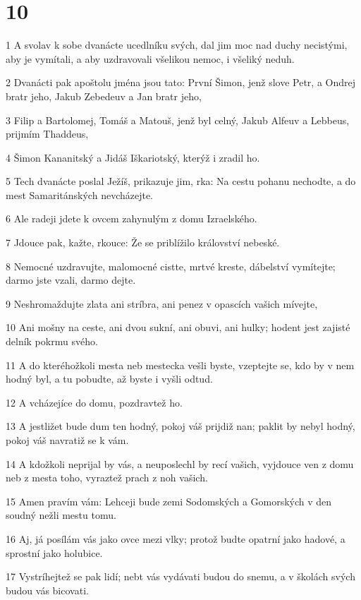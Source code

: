 \chapter{10}

\par 1 A svolav k sobe dvanácte ucedlníku svých, dal jim moc nad duchy necistými, aby je vymítali, a aby uzdravovali všelikou nemoc, i všeliký neduh.
\par 2 Dvanácti pak apoštolu jména jsou tato: První Šimon, jenž slove Petr, a Ondrej bratr jeho, Jakub Zebedeuv a Jan bratr jeho,
\par 3 Filip a Bartolomej, Tomáš a Matouš, jenž byl celný, Jakub Alfeuv a Lebbeus, prijmím Thaddeus,
\par 4 Šimon Kananitský a Jidáš Iškariotský, kterýž i zradil ho.
\par 5 Tech dvanácte poslal Ježíš, prikazuje jim, rka: Na cestu pohanu nechodte, a do mest Samaritánských nevcházejte.
\par 6 Ale radeji jdete k ovcem zahynulým z domu Izraelského.
\par 7 Jdouce pak, kažte, rkouce: Že se priblížilo království nebeské.
\par 8 Nemocné uzdravujte, malomocné cistte, mrtvé kreste, dábelství vymítejte; darmo jste vzali, darmo dejte.
\par 9 Neshromaždujte zlata ani stríbra, ani penez v opascích vašich mívejte,
\par 10 Ani mošny na ceste, ani dvou sukní, ani obuvi, ani hulky; hodent jest zajisté delník pokrmu svého.
\par 11 A do kteréhožkoli mesta neb mestecka vešli byste, vzeptejte se, kdo by v nem hodný byl, a tu pobudte, až byste i vyšli odtud.
\par 12 A vcházejíce do domu, pozdravtež ho.
\par 13 A jestližet bude dum ten hodný, pokoj váš prijdiž nan; paklit by nebyl hodný, pokoj váš navratiž se k vám.
\par 14 A kdožkoli neprijal by vás, a neuposlechl by recí vašich, vyjdouce ven z domu neb z mesta toho, vyraztež prach z noh vašich.
\par 15 Amen pravím vám: Lehceji bude zemi Sodomských a Gomorských v den soudný nežli mestu tomu.
\par 16 Aj, já posílám vás jako ovce mezi vlky; protož budte opatrní jako hadové, a sprostní jako holubice.
\par 17 Vystríhejtež se pak lidí; nebt vás vydávati budou do snemu, a v školách svých budou vás bicovati.
